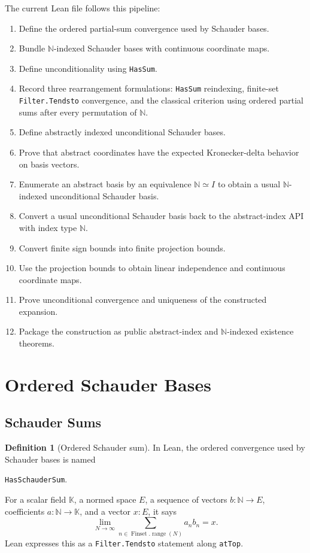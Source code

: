 \documentclass[12pt,a4paper]{article}
\theoremstyle{definition}
\newtheorem{definition}{Definition}[section]
\newcommand{\Nat}{\mathbb{N}}
\newcommand{\K}{\mathbb{K}}
\newcommand{\Finset}{\operatorname{Finset}}
\newcommand{\range}{\operatorname{range}}
\begin{document}
The current Lean file follows this pipeline:

\begin{enumerate}
  \item Define the ordered partial-sum convergence used by Schauder bases.
  \item Bundle $\Nat$-indexed Schauder bases with continuous coordinate maps.
  \item Define unconditionality using \verb|HasSum|.
  \item Record three rearrangement formulations: \verb|HasSum| reindexing,
    finite-set \verb|Filter.Tendsto| convergence, and the classical criterion
    using ordered partial sums after every permutation of $\Nat$.
  \item Define abstractly indexed unconditional Schauder bases.
  \item Prove that abstract coordinates have the expected Kronecker-delta
    behavior on basis vectors.
  \item Enumerate an abstract basis by an equivalence $\Nat \simeq I$ to obtain
    a usual $\Nat$-indexed unconditional Schauder basis.
  \item Convert a usual unconditional Schauder basis back to the abstract-index
    API with index type $\Nat$.
  \item Convert finite sign bounds into finite projection bounds.
  \item Use the projection bounds to obtain linear independence and continuous
    coordinate maps.
  \item Prove unconditional convergence and uniqueness of the constructed
    expansion.
  \item Package the construction as public abstract-index and $\Nat$-indexed
    existence theorems.
\end{enumerate}

\newpage

\section{Ordered Schauder Bases}

\subsection{Schauder Sums}

\begin{definition}[Ordered Schauder sum]
In Lean, the ordered convergence used by Schauder bases is named
\begin{center}
\verb|HasSchauderSum|.
\end{center}
For a scalar field $\K$, a normed space $E$, a sequence of vectors
$b : \Nat \to E$, coefficients $a : \Nat \to \K$, and a vector $x : E$, it says
\[
  \lim_{N\to\infty}
  \sum_{n\in \Finset.\range(N)} a_n b_n
  =
  x.
\]
Lean expresses this as a \verb|Filter.Tendsto| statement along \verb|atTop|.
\end{definition}
\end{document}
